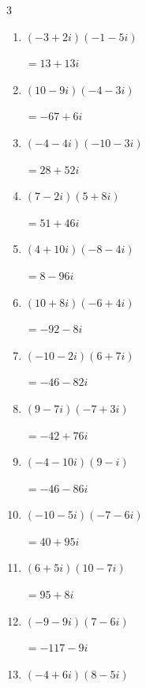 \begin{multicols}{3}
\begin{enumerate}
        $\displaystyle =-28-4i$

  \item $\displaystyle (-3+2i)(-1-5i)$

        $\displaystyle =13+13i$

  \item $\displaystyle (10-9i)(-4-3i)$

        $\displaystyle =-67+6i$

  \item $\displaystyle (-4-4i)(-10-3i)$

        $\displaystyle =28+52i$

\columnbreak %

\resetques

  \item $\displaystyle (7-2i)(5+8i)$

        $\displaystyle =51+46i$

  \item $\displaystyle (4+10i)(-8-4i)$

        $\displaystyle =8-96i$

  \item $\displaystyle (10+8i)(-6+4i)$

        $\displaystyle =-92-8i$

  \item $\displaystyle (-10-2i)(6+7i)$

        $\displaystyle =-46-82i$

  \item $\displaystyle (9-7i)(-7+3i)$

        $\displaystyle =-42+76i$

  \item $\displaystyle (-4-10i)(9-i)$

        $\displaystyle =-46-86i$

  \item $\displaystyle (-10-5i)(-7-6i)$

        $\displaystyle =40+95i$

  \item $\displaystyle (6+5i)(10-7i)$

        $\displaystyle =95+8i$

  \item $\displaystyle (-9-9i)(7-6i)$

        $\displaystyle =-117-9i$

  \item $\displaystyle (-4+6i)(8-5i)$


\end{enumerate}
\end{multicols}
